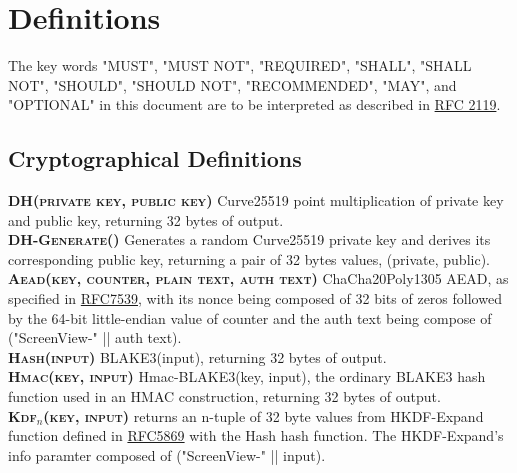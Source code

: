 \section{Definitions}

The key words "MUST", "MUST NOT", "REQUIRED", "SHALL", "SHALL NOT",
"SHOULD", "SHOULD NOT", "RECOMMENDED", "MAY", and "OPTIONAL" in this
document are to be interpreted as described in \href{https://datatracker.ietf.org/doc/html/rfc2119}{RFC 2119}.

\subsection{Cryptographical Definitions}

\textbf{\textsc{DH(private key, public key)}} Curve25519 point multiplication of private key and public key, returning 32 bytes of output.\\

\textbf{\textsc{DH-Generate()} }Generates a random Curve25519 private key and derives its corresponding public key,
returning a pair of 32 bytes values, (private, public).\\

\textbf{\textsc{Aead(key, counter, plain text, auth text)}} ChaCha20Poly1305 AEAD, as specified in \href{https://www.rfc-editor.org/rfc/rfc7539}{RFC7539},
with its nonce being composed of 32 bits of zeros followed by the 64-bit little-endian value of counter and the auth
text being compose of  ("ScreenView-" || auth text).\\

\textbf{\textsc{Hash(input)}} BLAKE3(input), returning 32 bytes of output.\\

\textbf{\textsc{Hmac(key, input)}} Hmac-BLAKE3(key, input), the ordinary BLAKE3 hash function used in an
HMAC construction, returning 32 bytes of output.\\

\textbf{\textsc{Kdf$_n$(key, input)}} returns an n-tuple of 32 byte values from HKDF-Expand function defined in \href{https://datatracker.ietf.org/doc/html/rfc5869}{RFC5869}
with the Hash hash function. The HKDF-Expand's info paramter composed of ("ScreenView-" || input). \\
